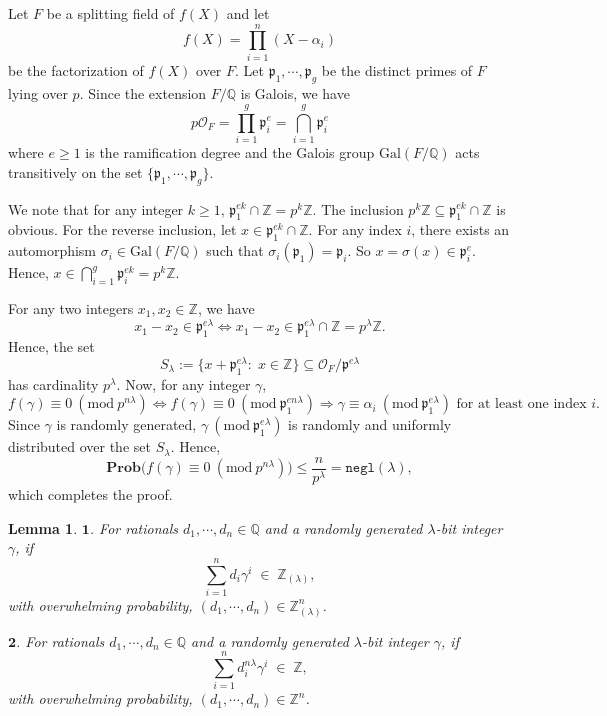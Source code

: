 \documentclass[11pt, lettersize, notitlepage, leqno, footskip=0.6cm]{article}
\newcommand{\bz}{\mathbb Z}
\newcommand{\bq}{\mathbb Q}
\newcommand{\pl}{\prod\limits}
\newcommand{\slim}{\sum\limits}
\newcommand{\ttt}{\texttt}
\newcommand{\Gal}{\mathrm{Gal}}
\newcommand{\negl}{\ttt{{negl}}}
\newcommand{\LRA}{\Longleftrightarrow}
\newcommand{\mc}{\mathcal}
\newcommand{\mbf}{\mathbf}
\newcommand{\mfp}{\mathfrak{p}}
\newcommand{\al}{\alpha}
\newcommand{\lam}{\lambda}
\newcommand{\bzlam}{\bz_{(\lam)}}
\newcommand{\sub}{\subseteq}
\newcommand{\vs}{\vspace{-0.15cm}}
\newcommand{\noin}{\noindent}
\newcommand{\op}{overwhelming probability}
\newcommand{\Mod}[1]{\ (\mathrm{mod}\ #1)}
\newtheorem{Lem}[Thm]{Lemma}
\numberwithin{equation}{section}
\begin{document}
\begin{prf} Let $F$ be a splitting field of $f(X)$ and let \vs $${f}(X) = \pl_{i=1}^n (X-\al_i)$$ be the factorization of ${f}(X)$ over $F$. Let $\mfp_{1},\cdots,\mfp_g$ be the distinct primes of $F$ lying over $p$. Since the extension $F/\bq$ is Galois, we have \vs $$p\mc{O}_F = \pl_{i=1}^{g} \mfp_i^e = \bigcap\limits_{i=1}^{g} \mfp_i^e$$ where $e\geq 1$ is the ramification degree and the Galois group $\Gal(F/\bq)$ acts transitively on the set $\{ \mfp_1,\cdots,\mfp_g\}$.

We note that for any integer $k\geq 1$, $\mfp_1^{ek}\cap \bz = p^{k}\bz$. The inclusion $p^{k}\bz\sub \mfp_1^{ek}\cap \bz$ is obvious. For the reverse inclusion, let $x\in \mfp_1^{ek}\cap \bz$. For any index $i$, there exists an automorphism $\sigma_i\in \Gal(F/\bq)$ such that $\sigma_i(\mfp_1) = \mfp_i$. So $x = \sigma(x) \in \mfp_i^e$. Hence, $x\in \bigcap\limits_{i=1}^g \mfp_i^{ek} = p^{k}\bz$.

For any two integers $x_1,x_2\in \bz$, we have \vs $$x_1-x_2\in \mfp_1^{e\lam}\LRA x_1-x_2\in \mfp_1^{e\lam}\cap \bz = p^{\lam}\bz.$$ Hence, the set \vs $$ S_{\lam}:= \{x + {\mfp_1^{e\lam}}:\;x\in\bz \}\sub \mc{O}_F/\mfp^{e\lam} $$ has cardinality $p^{\lam}$. Now, for any integer $\gamma$, \vs $$f(\gamma)\equiv 0 \Mod{p^{n\lam}} \LRA f(\gamma)\equiv 0 \Mod{\mfp_1^{en\lam}}  \Longrightarrow \gamma\equiv \al_i \Mod{\mfp_1^{e\lam}}\text{ for at least one index } i. $$  Since $\gamma$ is randomly generated, $\gamma\Mod{\mfp_1^{e\lam}}$ is randomly and uniformly distributed over the set $S_{\lam}$. Hence, \vs $$ \mbf{Prob}\big( f(\gamma)\equiv 0 \Mod{p^{n\lam}} \big)\leq \frac{n}{p^{\lam}} = \negl(\lam),$$ which completes the proof.\end{prf}

\begin{Lem}$\mbf{1}$. For rationals $d_1,\cdots, d_n\in \bq$ and a randomly generated $\lam$-bit integer $\gamma$, if \vs$$\sum\limits_{i=1}^n d_i\gamma^i\; \in \;\bzlam,$$ with \op, $(d_1,\cdots, d_n)\in \bzlam^n$.\vspace{0.1cm}

\noin $\mbf{2}$. For rationals $d_1,\cdots, d_n\in \bq$ and a randomly generated $\lam$-bit integer $\gamma$, if \vs $$\slim_{i=1}^n d_i^{n\lam}\gamma^i\; \in \;\bz,$$ with \op, $(d_1,\cdots, d_n)\in \bz^n$.\end{Lem}
\end{document}
